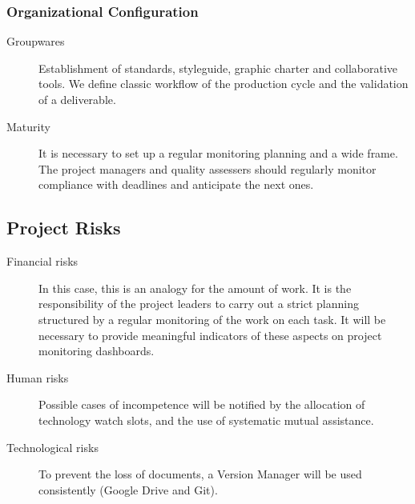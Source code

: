 \documentclass{article}%
\begin{document}
\subsubsection {Organizational Configuration}

\begin {description}
\item [Groupwares] Establishment of standards, styleguide,
graphic charter and collaborative tools. We define classic
workflow of the production cycle and the validation of a deliverable.
\item [Maturity] It is necessary to set up a regular monitoring
planning and a wide frame. The project managers and
quality assessers should regularly monitor compliance with
deadlines and anticipate the next ones.
\end {description}

\subsection {Project Risks}

\begin {description}
\item [Financial risks] In this case, this is an analogy for
the amount of work. It is the responsibility of the
project leaders to carry out a strict planning structured by a
regular monitoring of the work on each task. It will be necessary
to provide meaningful indicators of these aspects on
project monitoring dashboards.
\item [Human risks] Possible cases of incompetence will be notified by
the allocation of technology watch slots, and the use of
systematic mutual assistance.
\item [Technological risks] To prevent the loss of documents, a
Version Manager will be used consistently (Google Drive and Git).
\end {description}
\end{document}
